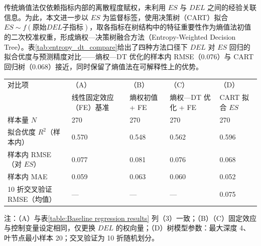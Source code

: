 传统熵值法仅依赖指标内部的离散程度赋权，未利用 $ES$ 与 $DEL$ 之间的经验关联信息。为此，本文进一步以 $ES$ 为监督标签，使用决策树（CART）拟合 $ES\sim f(\text{原始$DEL$子指标})$，取各指标在树结构中的特征重要性作为熵值法初值的二次校准权重，形成熵权—决策树融合方法（Entropy-Weighted Decision Tree）。表\ref{tab:entropy_dt_compare}给出了四种方法口径下 $DEL$ 对 $ES$ 回归的拟合优度与预测精度对比——熵权—DT 优化的样本内 RMSE（0.076）与 CART 回归树（0.068）接近，同时保留了熵值法在可解释性上的优势。

\begin{minipage}{\textwidth}
\centering
    \small
    \begin{tabularx}{\linewidth}{lXXXX}
    \hline
    对比项 & （A） & （B） & （C） & （D） \\
    ~& 线性固定效应（FE）基准 & 熵权初值 + FE & 熵权—DT 优化 + FE& CART 拟合 $ES$\\
    \hline
    样本量 $N$ & 270 & 270 & 270 & 270 \\
    拟合优度 $R^2$（样本内） & 0.570 & 0.548 & 0.562 & 0.596 \\
    样本内 RMSE（对 $ES$） & 0.077 & 0.081 & 0.076 & 0.068 \\
    样本内 MAE & 0.059 & 0.063 & 0.060 & 0.052 \\
    10 折交叉验证 RMSE（均值） & --- & --- & --- & 0.075 \\
    \hline
    \end{tabularx}
    \noindent\footnotesize
    注：（A）与表\ref{table:Baseline regression results} 列（3）一致；（B）（C）固定效应与控制变量设定相同，仅更换 $DEL$ 的权向量；（D）树模型参数：最大深度 4、叶节点最小样本 20；交叉验证为 10 折随机划分。
\end{minipage}

